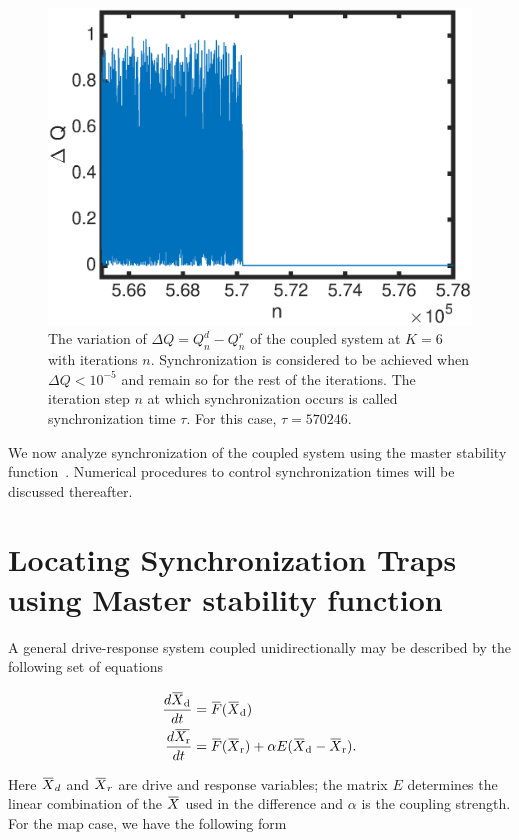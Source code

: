 \documentclass[reprint,amsmath,amssymb,aps,pre]{revtex4-1}
\newcommand{\overbar}[1]{\mkern 1.5mu\overline{\mkern-1.5mu#1\mkern-1.5mu}\mkern 1.5mu}
\begin{document}
\begin{figure}[t]
	\includegraphics[scale=.4]{Sync_exmaple}
	\caption{\label{fig:sync_ex} \footnotesize The variation of $\Delta Q = Q^d_n-Q^r_n$ of the coupled system at $K = 6$ with iterations $n$. Synchronization is considered to be achieved when $\Delta Q < 10^{-5}$ and remain so for the rest of the iterations. The iteration step $n$ at which synchronization occurs is called synchronization time $\tau$. For this case, $\tau = 570 246.$ }
\end{figure}

We now analyze synchronization of the coupled system using the master stability function~\cite{Pecora1998}. Numerical procedures to control synchronization times will be discussed thereafter.  

\section{Locating Synchronization Traps using Master stability function}
\label{Master stability function}
A general drive-response system coupled unidirectionally may be described by the following set of equations

\begin{align}
\frac{d\overbar{X}_\textnormal{d}}{dt} & = \overbar{F}(\overbar{X}_\textnormal{d}) \nonumber  \\
\frac{d\overbar{X_\textnormal{r}}}{dt} &= \overbar{F}(\overbar{X}_\textnormal{r}) + \alpha 
E(\overbar{X}_\textnormal{d}-\overbar{X}_\textnormal{r}).
\end{align}

\noindent Here $\overbar{X}_d$ and $\overbar{X}_r$ are drive and response 
variables; the matrix $E$ determines the linear combination of the 
$\overbar{X}$ used in the difference and $\alpha$ is the coupling strength. 
For the map case, we have the following form
\end{document}

